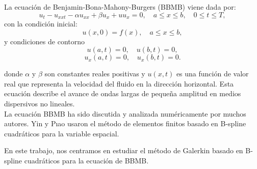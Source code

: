 La ecuación de Benjamin-Bona-Mahony-Burgers (BBMB) viene dada por:
\begin{equation} \label{ec_1}
    u_{t}-u_{xxt}-\alpha u_{xx} + \beta u_{x} +uu_{x}=0,\quad a\leq x \leq b ,\quad 0\leq t \leq T,
\end{equation}
con la condición inicial:
\begin{equation}
    u(x,0)=f(x), \quad a\leq x \leq b,
\end{equation}\label{condinicial}
y condiciones de contorno
\begin{equation}
    u(a,t)=0, \quad u(b,t)=0,
\end{equation}\label{condcontorno}
\begin{equation}
    u_{x}(a,t)=0, \quad u_{x}(b,t)=0.
\end{equation}  
  
donde $\alpha$ y $\beta$ son constantes reales positivas y $u(x,t)$ es una función de valor real que representa la velocidad del fluido en la dirección horizontal. Esta ecuación describe el avance de ondas largas de pequeña amplitud en medios dispersivos no lineales.\\

 La ecuación BBMB ha sido discutida y analizada numéricamente por muchos autores. Yin y Pıao \cite{piao3} usaron el método de elementos finitos basado en B-spline cuadráticos para la variable espacial.


En este trabajo, nos centramos en estudiar el método de Galerkin basado en B-spline cuadráticos para la ecuación de BBMB.


